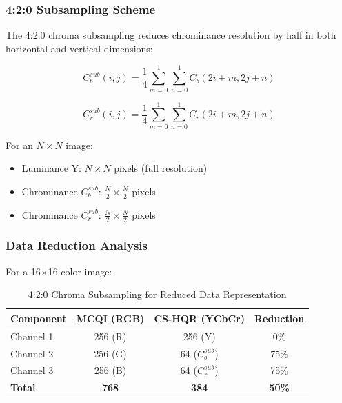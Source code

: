 \documentclass[11pt,a4paper]{article}
\begin{document}
\subsubsection{4:2:0 Subsampling Scheme}

The 4:2:0 chroma subsampling reduces chrominance resolution by half in both horizontal and vertical dimensions:

\begin{equation}
C_b^{sub}(i,j) = \frac{1}{4}\sum_{m=0}^{1}\sum_{n=0}^{1} C_b(2i+m, 2j+n)
\label{eq:cb_subsample}
\end{equation}

\begin{equation}
C_r^{sub}(i,j) = \frac{1}{4}\sum_{m=0}^{1}\sum_{n=0}^{1} C_r(2i+m, 2j+n)
\label{eq:cr_subsample}
\end{equation}

For an $N \times N$ image:
\begin{itemize}
    \item Luminance Y: $N \times N$ pixels (full resolution)
    \item Chrominance $C_b^{sub}$: $\frac{N}{2} \times \frac{N}{2}$ pixels
    \item Chrominance $C_r^{sub}$: $\frac{N}{2} \times \frac{N}{2}$ pixels
\end{itemize}

\subsubsection{Data Reduction Analysis}

For a 16×16 color image:

\begin{table}[H]
\centering
\caption{4:2:0 Chroma Subsampling for Reduced Data Representation}
\label{tab:data_reduction}
\begin{tabular}{@{}lccc@{}}
\toprule
\textbf{Component} & \textbf{MCQI (RGB)} & \textbf{CS-HQR (YCbCr)} & \textbf{Reduction} \\
\midrule
Channel 1 & 256 (R) & 256 (Y) & 0\% \\
Channel 2 & 256 (G) & 64 ($C_b^{sub}$) & 75\% \\
Channel 3 & 256 (B) & 64 ($C_r^{sub}$) & 75\% \\
\midrule
\textbf{Total} & \textbf{768} & \textbf{384} & \textbf{50\%} \\
\bottomrule
\end{tabular}
\end{table}
\end{document}
